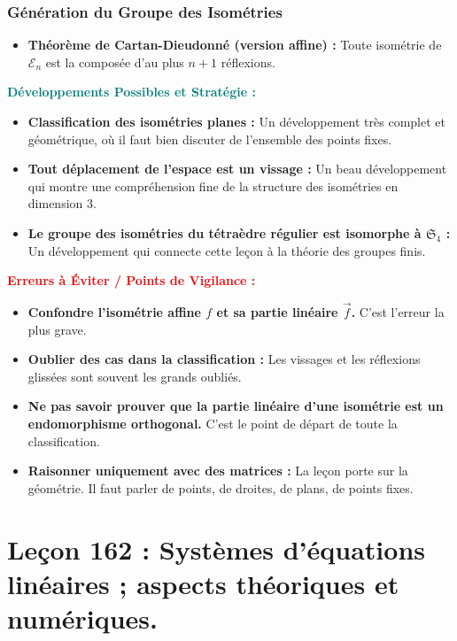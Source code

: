 \documentclass[12pt, a4paper, parskip=full]{report}
\theoremstyle{agregstyle}
\newenvironment{developpements}
  {\par\medskip\noindent\begin{oframed}\noindent\textbf{\textcolor{teal}{Développements Possibles et Stratégie :}}}
  {\end{oframed}\par\medskip}
\newenvironment{erreurs}
  {\par\medskip\noindent\begin{oframed}\noindent\textbf{\textcolor{red}{Erreurs à Éviter / Points de Vigilance :}}}
  {\end{oframed}\par\medskip}
\begin{document}
\subsection{Génération du Groupe des Isométries}
\begin{itemize}
    \item \textbf{Théorème de Cartan-Dieudonné (version affine) :} Toute isométrie de $\mathcal{E}_n$ est la composée d'au plus $n+1$ réflexions.
\end{itemize}

\begin{developpements}
    \begin{itemize}
        \item \textbf{Classification des isométries planes :} Un développement très complet et géométrique, où il faut bien discuter de l'ensemble des points fixes.
        \item \textbf{Tout déplacement de l'espace est un vissage :} Un beau développement qui montre une compréhension fine de la structure des isométries en dimension 3.
        \item \textbf{Le groupe des isométries du tétraèdre régulier est isomorphe à $\mathfrak{S}_4$ :} Un développement qui connecte cette leçon à la théorie des groupes finis.
    \end{itemize}
\end{developpements}

\begin{erreurs}
    \begin{itemize}
        \item \textbf{Confondre l'isométrie affine $f$ et sa partie linéaire $\vec{f}$.} C'est l'erreur la plus grave.
        \item \textbf{Oublier des cas dans la classification :} Les vissages et les réflexions glissées sont souvent les grands oubliés.
        \item \textbf{Ne pas savoir prouver que la partie linéaire d'une isométrie est un endomorphisme orthogonal.} C'est le point de départ de toute la classification.
        \item \textbf{Raisonner uniquement avec des matrices :} La leçon porte sur la géométrie. Il faut parler de points, de droites, de plans, de points fixes.
    \end{itemize}
\end{erreurs}
\chapter{Leçon 162 : Systèmes d'équations linéaires ; aspects théoriques et numériques.}
\end{document}
